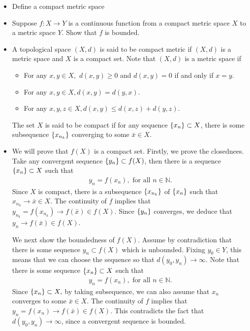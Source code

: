 \begin{problem}
\begin{itemize}
    \item[(a)] Define a compact metric space
    \item[(b)] Suppose $f: X \to Y$ is a continuous function from a compact metric space $X$ to a metric space $Y.$ Show that $f$ is bounded.
\end{itemize}
\begin{solution}
\begin{itemize}
    \item[(a)] A topological space $(X,d)$ is said to be compact metric if $(X,d)$ is a metric space and $X$ is a compact set. Note that $(X,d)$ is a metric space if 
    \begin{itemize}
        \item For any $x,y\in X,$ $d(x,y)\ge 0$ and $d(x,y)=0$ if and only if $x=y.$
        \item For any $x,y\in X,d(x,y)=d(y,x).$
        \item For any $x,y,z\in X, d(x,y)\le d(x,z)+d(y,z).$
    \end{itemize}
    The set $X$ is said to be compact if for any sequence $\left\{ x_n\right\}\subset X$, there is some subsequence $\left\{ x_{n_k}\right\}$ converging to some $\bar x\in X.$
    \item[(b)]We will prove that $f(X)$ is a compact set. Firstly, we prove the closednees. Take any convergent sequence $\left\{ y_n\right\}\subset f(X)$, then there is a sequence $\left\{ x_n\right\}\subset X$ such that 
    \begin{align*}
        y_n=f(x_n),\text{ for all }n\in\mathbb{N}.
    \end{align*}
    Since $X$ is compact, there is a subsequence $\left\{ x_{n_k}\right\}$ of $\left\{ x_n\right\}$ such that $x_{n_k}\rightarrow \bar x\in X.$ The continuity of $f$ implies that $y_{n_k}=f(x_{n_k})\rightarrow f(\bar x)\in f(X).$ Since $\left\{ y_n\right\}$ converges, we deduce that $y_n\rightarrow f(\bar x)\in f(X)$.
    
    We next show the boundedness of $f(X).$ Assume by contradiction that there is some sequence ${y_n}\subset f(X)$ which is unbounded. Fixing $y_0\in Y$, this means that we can choose the sequence so that $d(y_0,y_n)\rightarrow \infty.$ Note that there is some sequence $\left\{ x_n\right\}\subset X$ such that 
    \begin{align*}
        y_n=f(x_n),\text{ for all }n\in\mathbb{N}.
    \end{align*}
    Since $\left\{ x_n\right\}\subset X,$ by taking subsequence, we can also assume that $x_n$ converges to some $\bar x\in X.$ The continuity of $f$ implies that $y_n=f(x_n)\rightarrow f(\bar x)\in f(X).$ This contradicts the fact that $d(y_0,y_n)\rightarrow \infty$, since a convergent sequence is bounded.
\end{itemize}
\end{solution}
\end{problem}

